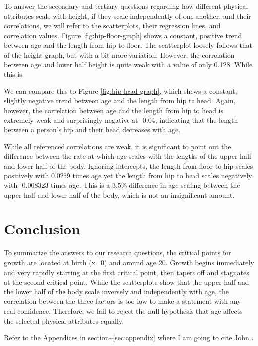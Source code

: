\documentclass[]{article}
\begin{document}
To answer the secondary and tertiary questions regarding how different
physical attributes scale with height, if they scale independently of
one another, and their correlations, we will refer to the scatterplots,
their regression lines, and correlation values. Figure
\ref{fig:hip-floor-graph} shows a constant, positive trend between age
and the length from hip to floor. The scatterplot loosely follows that
of the height graph, but with a bit more variation. However, the
correlation between age and lower half height is quite weak with a value
of only 0.128. While this is

We can compare this to Figure \ref{fig:hip-head-graph}, which shows a
constant, slightly negative trend between age and the length from hip to
head. Again, however, the correlation between age and the length from
hip to head is extremely weak and surprisingly negative at -0.04,
indicating that the length between a person's hip and their head
decreases with age.

While all referenced correlations are weak, it is significant to point
out the difference between the rate at which age scales with the lengths
of the upper half and lower half of the body. Ignoring intercepts, the
length from floor to hip scales positively with 0.0269 times age yet the
length from hip to head scales negatively with -0.008323 times age. This
is a 3.5\% difference in age scaling between the upper half and lower
half of the body, which is not an insignificant amount.

\section{Conclusion}
\label{sec:conclusion}

To summarize the answers to our research questions, the critical points
for growth are located at birth (x=0) and around age 20. Growth begins
immediately and very rapidly starting at the first critical point, then
tapers off and stagnates at the second critical point. While the
scatterplots show that the upper half and the lower half of the body
scale inversely and independently with age, the correlation between the
three factors is too low to make a statement with any real confidence.
Therefore, we fail to reject the null hypothesis that age affects the
selected physical attributes equally. \newpage

\vspace{0.5in}

\newpage

Refer to the Appendices in section\textasciitilde{}\ref{sec:appendix}
where I am going to cite John \citep[pp. 2-3]{Tukey:1962}.
\end{document}
